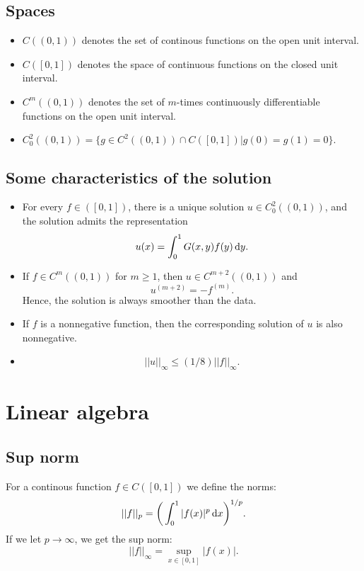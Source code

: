 \documentclass[a4paper, 11pt, notitlepage, english]{article}
\renewcommand{\d}{{\rm d}}
\begin{document}
\clearpage

\subsection{Spaces}
\begin{itemize}
    \item $C((0,1))$ denotes the set of continous functions on the open unit interval.
    \item $C([0,1])$ denotes the space of continuous functions on the closed unit interval.
    \item $C^m((0,1))$ denotes the set of $m$-times continuously differentiable functions on the open unit interval.
    \item $C^2_0((0,1)) = \{ g\in C^2((0,1)) \cap C([0,1])|g(0)=g(1)=0\}.$
\end{itemize}

\subsection{Some characteristics of the solution}
\begin{itemize}
\item For every $f\in ([0,1])$, there is a unique solution $u \in C_0^2((0,1))$, and the solution admits the representation
$$u(x) \texttt{}= \int_0^1 G(x,y)f(y) \, \d y.$$
\item If $f\in C^m((0,1))$ for $m\geq 1$, then $u\in C^{m+2}((0,1))$ and
$$u^(m+2) = -f^(m).$$
Hence, the solution is always smoother than the data.
\item If $f$ is a nonnegative function, then the corresponding solution of $u$ is also nonnegative.
\item $$||u||_\infty \leq (1/8)||f||_\infty.$$
\end{itemize}

\section{Linear algebra}
\subsection{Sup norm}
For a continous function $f\in C([0,1])$ we define the norms:
$$||f||_p = \bigg(\int_0^1 |f(x)|^p \, \d x\bigg)^{1/p}.$$
If we let $p \to \infty$, we get the sup norm:
$$||f||_\infty = \sup_{x\in[0,1]} |f(x)|.$$
\end{document}

